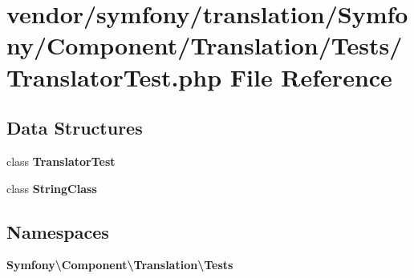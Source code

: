 \section{vendor/symfony/translation/\+Symfony/\+Component/\+Translation/\+Tests/\+Translator\+Test.php File Reference}
\label{_translator_test_8php}
\subsection*{Data Structures}
\begin{DoxyCompactItemize}
\item 
class {\bf Translator\+Test}
\item 
class {\bf String\+Class}
\end{DoxyCompactItemize}
\subsection*{Namespaces}
\begin{DoxyCompactItemize}
\item 
 {\bf Symfony\textbackslash{}\+Component\textbackslash{}\+Translation\textbackslash{}\+Tests}
\end{DoxyCompactItemize}
